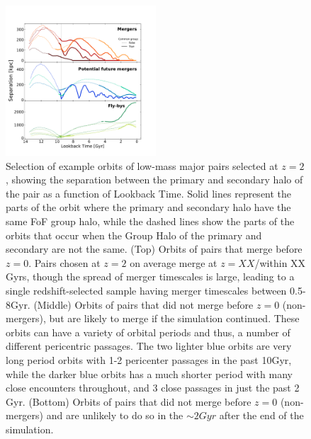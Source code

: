\documentclass[twocolumn]{aastex631}
\begin{document}
\begin{figure}[htb]
    \centering
    \includegraphics[width=0.5\textwidth]{plots/bet-on-it/exorbits_physical.pdf}
    \caption{Selection of example orbits of low-mass major pairs selected at $z=2$, showing the separation between the primary and secondary halo of the pair as a function of Lookback Time.
    Solid lines represent the parts of the orbit where the primary and secondary halo have the same FoF group halo, while the dashed lines show the parts of the orbits that occur when the Group Halo of the primary and secondary are not the same. 
    (Top) Orbits of pairs that merge before $z=0$. Pairs chosen at $z=2$ on average merge at $z=XX$/within XX Gyrs, though the spread of merger timescales is large, leading to a single redshift-selected sample having merger timescales between 0.5-8Gyr. 
    (Middle) Orbits of pairs that did not merge before $z=0$ (non-mergers), but are likely to merge if the simulation continued. These orbits can have a variety of orbital periods and thus, a number of different pericentric passages. The two lighter blue orbits are very long period orbits with 1-2 pericenter passages in the past 10Gyr, while the darker blue orbits has a much shorter period with many close encounters throughout, and 3 close passages in just the past 2 Gyr. 
    (Bottom) Orbits of pairs that did not merge before $z=0$ (non-mergers) and are unlikely to do so in the $\sim2Gyr$ after the end of the simulation. 
    }
    \label{fig:example-orbits}
\end{figure}
\end{document}
